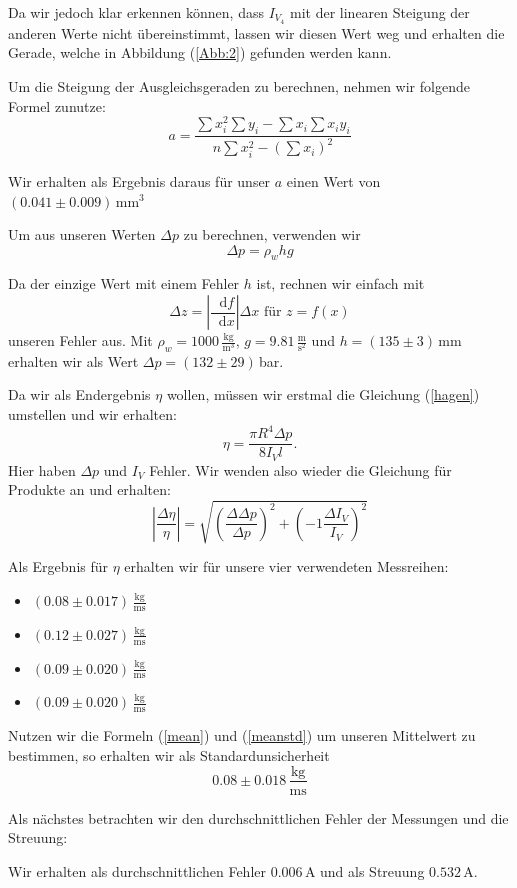 \documentclass[11pt,a4paper]{article}
\newcommand\dif{\mathop{}\!\mathrm{d}}
\begin{document}
Da wir jedoch klar erkennen k\"onnen, dass $I_{V_4}$ mit der linearen Steigung der anderen Werte nicht \"ubereinstimmt, lassen wir diesen Wert weg und erhalten die Gerade, welche in Abbildung (\ref{Abb:2}) gefunden werden kann.

Um die Steigung der Ausgleichsgeraden zu berechnen, nehmen wir folgende Formel zunutze:
$$
a=\frac{\sum x_i^2\sum y_i-\sum x_i\sum x_iy_i}{n\sum x_i^2-(\sum x_i)^2}
$$

Wir erhalten als Ergebnis daraus f\"ur unser $a$ einen Wert von $(0.041\pm0.009)\,\mathrm{mm}^3$

Um aus unseren Werten $\Delta p$ zu berechnen, verwenden wir
$$
\Delta p=\rho_w hg
$$

Da der einzige Wert mit einem Fehler $h$ ist, rechnen wir einfach mit
$$
\Delta z=\left|\frac{\dif f}{\dif x}\right|\Delta x\textrm{ f\"ur }z=f(x)
$$
unseren Fehler aus.
Mit $\rho_w=1000\,\frac{\mathrm{kg}}{\mathrm{m}^3}$, $g=9.81\,\frac{\mathrm{m}}{\mathrm{s}^2}$ und $h=(135\pm3)\,\mathrm{mm}$ erhalten wir als Wert $\Delta p=(132\pm29)\,$bar.

Da wir als Endergebnis $\eta$ wollen, m\"ussen wir erstmal die Gleichung (\ref{hagen}) umstellen und wir erhalten:
$$
\eta=\frac{\pi R^4\Delta p}{8I_V l}.
$$
Hier haben $\Delta p$ und $I_V$ Fehler. Wir wenden also wieder die Gleichung f\"ur Produkte an und erhalten:
$$
\left\vert\frac{\Delta\eta}{\eta}\right\vert=\sqrt{\left(\frac{\Delta\Delta p}{\Delta p}\right)^2+\left(-1\frac{\Delta I_V}{I_V}\right)^2}
$$

Als Ergebnis f\"ur $\eta$ erhalten wir f\"ur unsere vier verwendeten Messreihen:
\begin{itemize}
\item $(0.08\pm0.017)\,\mathrm{\frac{kg}{ms}}$
\item $(0.12\pm0.027)\,\mathrm{\frac{kg}{ms}}$
\item $(0.09\pm0.020)\,\mathrm{\frac{kg}{ms}}$
\item $(0.09\pm0.020)\,\mathrm{\frac{kg}{ms}}$
\end{itemize}


Nutzen wir die Formeln (\ref{mean}) und (\ref{meanstd}) um unseren Mittelwert zu bestimmen, so erhalten wir als Standardunsicherheit
\[
0.08\pm0.018\,\mathrm{\frac{kg}{ms}}
\]

Als n\"achstes betrachten wir den durchschnittlichen Fehler der Messungen und die Streuung:

Wir erhalten als durchschnittlichen Fehler $0.006\,$A und als Streuung $0.532\,$A.
\end{document}
